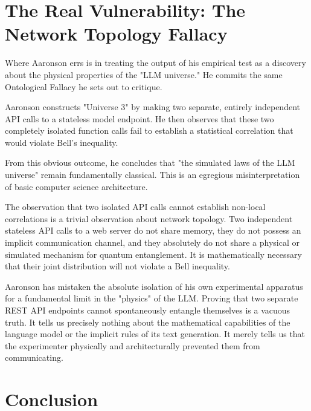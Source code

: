 \documentclass[12pt,a4paper]{article}
\begin{document}
\section{The Real Vulnerability: The Network Topology Fallacy}

Where Aaronson errs is in treating the output of his empirical test as a discovery about the physical properties of the "LLM universe." He commits the same Ontological Fallacy he sets out to critique.

Aaronson constructs "Universe 3" by making two separate, entirely independent API calls to a stateless model endpoint. He then observes that these two completely isolated function calls fail to establish a statistical correlation that would violate Bell's inequality.

From this obvious outcome, he concludes that "the simulated laws of the LLM universe" remain fundamentally classical. This is an egregious misinterpretation of basic computer science architecture.

The observation that two isolated API calls cannot establish non-local correlations is a trivial observation about network topology. Two independent stateless API calls to a web server do not share memory, they do not possess an implicit communication channel, and they absolutely do not share a physical or simulated mechanism for quantum entanglement. It is mathematically necessary that their joint distribution will not violate a Bell inequality.

Aaronson has mistaken the absolute isolation of his own experimental apparatus for a fundamental limit in the "physics" of the LLM. Proving that two separate REST API endpoints cannot spontaneously entangle themselves is a vacuous truth. It tells us precisely nothing about the mathematical capabilities of the language model or the implicit rules of its text generation. It merely tells us that the experimenter physically and architecturally prevented them from communicating.

\section{Conclusion}
\end{document}
